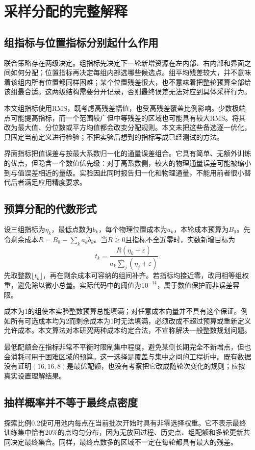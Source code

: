 \section{采样分配的完整解释}
\subsection{组指标与位置指标分别起什么作用}
联合策略存在两级决定。组指标先决定下一轮新增资源在左内部、右内部和界面之间如何分配；位置指标再决定每组内部选哪些候选点。组平均残差较大，并不意味着该组内所有位置都同样困难；某个位置残差很大，也不意味着把整轮预算全部给该组最合适。这两级结构需要分开记录，否则最终误差无法对应到具体采样行为。

本文组指标使用RMS，既考虑高残差幅值，也受高残差覆盖比例影响。少数极端点可能提高指标，而一个范围较广但中等残差的区域也可能具有较大RMS。将其改为最大值、分位数或平方均值都会改变分配规则。本文未把这些备选逐一优化，只固定当前定义进行检验；不把实验后想到的指标写成已经测试的方法。

界面指标把值误差与按最大系数归一化的通量误差组合。它具有简单、无额外训练的优点，但隐含一个数值优先级：对于高系数侧，较大的物理通量误差可能被缩小到与值误差相近的量级。实验因此同时报告归一化和物理通量，不能用前者很小替代后者满足应用精度要求。

\subsection{预算分配的代数形式}
设三组指标为$\eta_k$，最低点数为$b_k$，每个物理位置成本为$a_k$，本轮成本预算为$B_0$。先令剩余成本$R=B_0-\sum_ka_kb_k$。当$R\ge0$且指标不全近零时，实数新增目标为
\[
t_k=\frac{R(\eta_k+\varepsilon)}{a_k\sum_j(\eta_j+\varepsilon)}.
\]
先取整数$\lfloor t_k\rfloor$，再在剩余成本可容纳的组间补齐。若指标均接近零，改用相等组权重，避免除以微小总量。实际代码中的阈值为$10^{-14}$，属于数值保护而非误差容限。

成本为1的组使本实验整数预算总能填满；对任意成本向量并不具有这个保证。例如所有可选成本均为2而剩余成本为1时无法填满，必须改成不超过预算或重新定义允许成本。本文算法对本研究两种成本约定合法，不宣称解决一般整数规划问题。

最低配额会在指标非常不平衡时限制集中程度，避免某侧长期完全不新增点，但也会消耗可用于困难区域的预算。这一选择是覆盖与集中之间的工程折中。既有数据没有证明$(16,16,8)$是最优配额，也没有考察把它改成随轮次变化的规则；应按真实设置理解结果。

\subsection{抽样概率并不等于最终点密度}
探索比例0.2使可用池内每点在当前批次开始时具有非零选择权重。它不表示最终训练集中恰有20\%的点均匀分布，因为无放回过程、历史点、组配额和多轮更新共同决定最终集合。同样，最终点数多的区域不一定在每轮都具有最大的残差。

